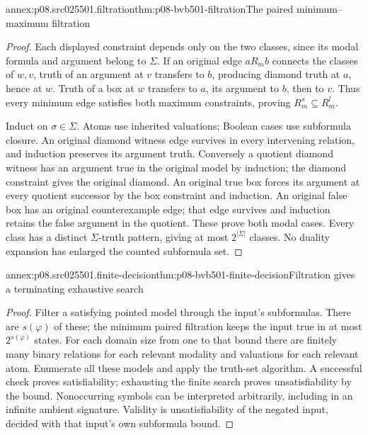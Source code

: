 \begin{annexitem}{annex:p08.src025501.filtration}{thm:p08-bvb501-filtration}{The paired minimum--maximum filtration}
\begin{proof}
Each displayed constraint depends only on the two classes, since its
modal formula and argument belong to \(\Sigma\). If an original
edge \(aR_mb\) connects the classes of \(w,v\), truth of an
argument at \(v\) transfers to \(b\), producing diamond truth
at \(a\), hence at \(w\). Truth of a box at \(w\) transfers
to \(a\), its argument to \(b\), then to \(v\). Thus every
minimum edge satisfies both maximum constraints, proving
\(R_m^s\subseteq R_m^l\).

Induct on \(\sigma\in\Sigma\). Atoms use inherited valuations;
Boolean cases use subformula closure. An original diamond witness edge
survives in every intervening relation, and induction preserves its
argument truth. Conversely a quotient diamond witness has an argument
true in the original model by induction; the diamond constraint gives
the original diamond. An original true box forces its argument at
every quotient successor by the box constraint and induction. An
original false box has an original counterexample edge; that edge
survives and induction retains the false argument in the quotient.
These prove both modal cases. Every class has a distinct
\(\Sigma\)-truth pattern, giving at most \(2^{|\Sigma|}\)
classes. No duality expansion has enlarged the counted subformula set.
\end{proof}
\end{annexitem}

\begin{annexitem}{annex:p08.src025501.finite-decision}{thm:p08-bvb501-finite-decision}{Filtration gives a terminating exhaustive search}
\begin{proof}
Filter a satisfying pointed model through the input's subformulas.
There are \(s(\varphi)\) of these; the minimum paired filtration
keeps the input true in at most \(2^{s(\varphi)}\) states.
For each domain size from one to that bound there are finitely many
binary relations for each relevant modality and valuations for each
relevant atom. Enumerate all these models and apply the truth-set
algorithm. A successful check proves satisfiability; exhausting the
finite search proves unsatisfiability by the bound. Nonoccurring symbols
can be interpreted arbitrarily, including in an infinite ambient
signature. Validity is unsatisfiability of the negated input, decided
with that input's own subformula bound.
\end{proof}
\end{annexitem}

